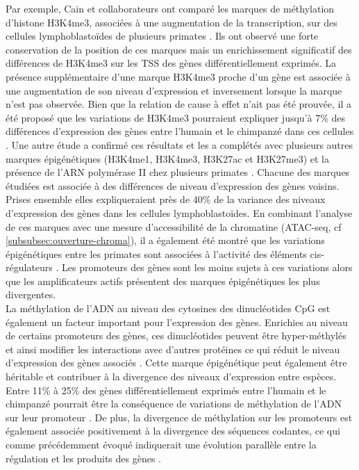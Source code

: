 Par exemple, Cain et collaborateurs ont comparé les marques de méthylation d’histone H3K4me3, associées à une augmentation de la transcription, sur des cellules lymphoblastoïdes de plusieurs primates \citep{cain_gene_2011}. Ils ont observé une forte conservation de la position de ces marques mais un enrichissement significatif des différences de H3K4me3 sur les \acrshort{TSS} des gènes différentiellement exprimés. La présence supplémentaire d’une marque H3K4me3 proche d’un gène est associée à une augmentation de son niveau d’expression et inversement lorsque la marque n’est pas observée. Bien que la relation de cause à effet n'ait pas été prouvée, il a été proposé que les variations de H3K4me3 pourraient expliquer jusqu’à 7\% des différences d’expression des gènes entre l’humain et le chimpanzé dans ces cellules \citep{cain_gene_2011}. Une autre étude a confirmé ces résultats et les a complétés avec plusieurs autres marques épigénétiques (H3K4me1, H3K4me3, H3K27ac et H3K27me3) et la présence de l’ARN polymérase II chez plusieurs primates \citep{zhou_epigenetic_2014}. Chacune des marques étudiées est associée à des différences de niveau d’expression des gènes voisins. Prises ensemble elles expliqueraient près de 40\% de la variance des niveaux d’expression des gènes dans les cellules lymphoblastoïdes. En combinant l’analyse de ces marques avec une mesure d’accessibilité de la chromatine (ATAC-seq, cf \ref{subsubsec:ouverture-chroma}), il a également été montré que les variations épigénétiques entre les primates sont associées à l’activité des éléments \gls{cis}-régulateurs \citep{garcia-perez_epigenomic_2021}. Les promoteurs des gènes sont les moins sujets à ces variations alors que les \glspl{amplificateur} actifs présentent des marques épigénétiques les plus divergentes. \\

La méthylation de l’ADN au niveau des cytosines des dinucléotides \acrshort{CpG} est également un facteur important pour l’expression des gènes. Enrichies au niveau de certains promoteurs des gènes, ces dinucléotides peuvent être hyper-méthylés et ainsi modifier les interactions avec d’autres protéines ce qui réduit le niveau d’expression des gènes associés \citep{jones_role_2001}. Cette marque épigénétique peut également être héritable et contribuer à la divergence des niveaux d’expression entre espèces. Entre 11\% à 25\% des gènes différentiellement exprimés entre l’humain et le chimpanzé pourrait être la conséquence de variations de méthylation de l’ADN sur leur promoteur \citep{pai_genome-wide_2011, blake_comparison_2020}. De plus, la divergence de méthylation sur les promoteurs est également associée positivement à la divergence des séquences codantes, ce qui comme précédemment évoqué indiquerait une évolution parallèle entre la régulation et les produits des gènes \citep{hernando-herraez_dynamics_2013}. \\

